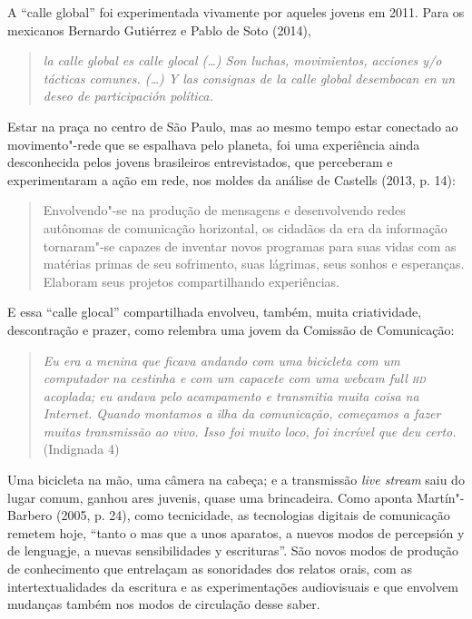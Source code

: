 A ``calle global'' foi experimentada vivamente por aqueles jovens em
2011. Para os mexicanos Bernardo Gutiérrez e Pablo de Soto (2014),

\begin{quote}
\emph{la calle global es calle glocal (\ldots{}) Son luchas, movimientos,
acciones y/o tácticas comunes. (\ldots{}) Y las consignas de la calle global
desembocan en un deseo de participación política. }
\end{quote}

Estar na praça no centro de São Paulo, mas ao mesmo tempo estar
conectado ao movimento"-rede que se espalhava pelo planeta, foi uma
experiência ainda desconhecida pelos jovens brasileiros
entrevistados, que perceberam e experimentaram a ação em rede, nos
moldes da análise de Castells (2013, p. 14):

\begin{quote}
Envolvendo"-se na produção de mensagens e desenvolvendo redes autônomas
de comunicação horizontal, os cidadãos da era da informação tornaram"-se
capazes de inventar novos programas para suas vidas com as matérias
primas de seu sofrimento, suas lágrimas, seus sonhos e esperanças.
Elaboram seus projetos compartilhando experiências.
\end{quote}

E essa ``calle glocal'' compartilhada envolveu, também, muita
criatividade, descontração e prazer, como relembra uma jovem da Comissão
de Comunicação:

\begin{quote}
\emph{Eu era a menina que ficava andando com uma bicicleta com um
computador na cestinha e com um capacete com uma webcam full \textsc{hd}
acoplada; eu andava pelo acampamento e transmitia muita coisa na
Internet. Quando montamos a ilha da comunicação, começamos a fazer
muitas transmissão ao vivo. Isso foi muito loco, foi incrível que deu
certo.} (Indignada 4)
\end{quote}

Uma bicicleta na mão, uma câmera na cabeça; e a transmissão \emph{live
stream} saiu do lugar comum, ganhou ares juvenis, quase uma brincadeira.
Como aponta Martín"-Barbero (2005, p. 24), como tecnicidade, as
tecnologias digitais de comunicação remetem hoje, ``tanto o mas que a
unos aparatos, a nuevos modos de percepsión y de lenguagje, a nuevas
sensibilidades y escrituras''. São novos modos de produção de
conhecimento que entrelaçam as sonoridades dos relatos orais, com as
intertextualidades da escritura e as experimentações audiovisuais e que
envolvem mudanças também nos modos de circulação desse saber.

